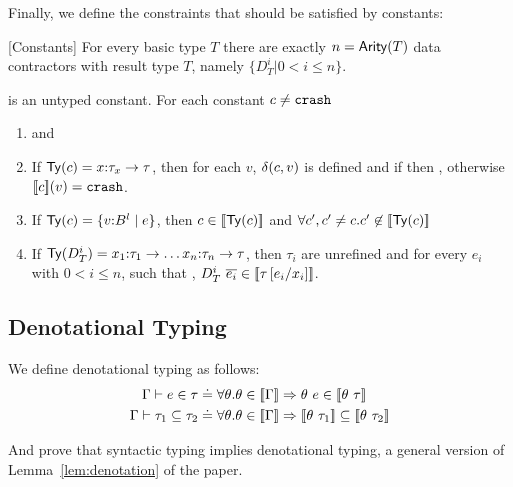 Finally, we define the constraints that should be satisfied by constants:
%
\begin{definition}{[Constants]}\label{def:constants}
For every basic type $T$ there are exactly  $n = \arity{T}$ 
data contractors with result type $T$, namely 
$\{D_T^i | 0 < i \leq n \}$.

\CRASH is an untyped constant.
%
For each constant $c \neq \CRASH$
\newcommand\pcond[1]{\ensuremath{}}
\newcommand\const{\ensuremath{c}}
\begin{enumerate}
\item \hastype{\emptyset}{c}{\constty{\const}} and 
%
\item If $\constty{c} = \tfun{x}{\tau_x}{\tau}$, then for each $v$, 
	$\ceval{\const}{v}$ is defined and 
	if  then
	,
	otherwise  $\interp{c}(v) = \CRASH$.
%	
\item If $\constty{c} = \tref{v}{B}{l}{e}$, 
	then 
	$c \in \interp{\constty{c}}$ and 
	$\forall c', c' \neq c. c' \not \in \interp{\constty{c}}$ 
%
\item If $\constty{D_T^i} = \tfun{x_1}{\tau_1}{\dots\tfun{x_n}{\tau_n}{\tau}}$, 
then $\tau_i$ are unrefined and for every $e_i$ with $0 < i \leq n$,
such that , 
$D_T^i\ \overline{e_i}\in \interp{\tau\sub{x_i}{e_i}}$.
\end{enumerate}
\end{definition}


\subsection{Denotational Typing}
We define denotational typing as follows:
\begin{align*}
\shastype{\Gamma}{e}{\tau} & \doteq
	\forall \theta . \theta\in\interp{\Gamma}\Rightarrow \theta\ e \in \interp{\theta \ \tau}\\
\sissubtype{\Gamma}{\tau_1}{\tau_2} & \doteq 
	\forall \theta . \theta\in\interp{\Gamma}\Rightarrow \interp{\theta\ \tau_1} \subseteq \interp{\theta\ \tau_2}
\end{align*}

And prove that syntactic typing implies denotational typing, 
\ie a general version of Lemma~\ref{lem:denotation} of the paper.



